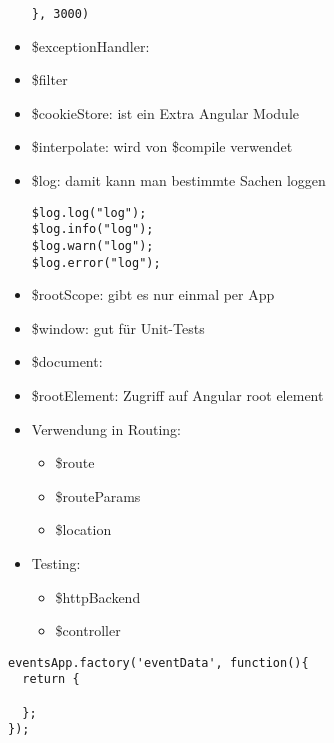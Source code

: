 \begin{itemize}
\begin{verbatim}
}, 3000)
    \end{verbatim}
  \item \$exceptionHandler:
  \item \$filter
  \item \$cookieStore: ist ein Extra Angular Module
  \item \$interpolate: wird von \$compile verwendet
  \item \$log: damit kann man bestimmte Sachen loggen
    \begin{verbatim}
$log.log("log");
$log.info("log");
$log.warn("log");
$log.error("log");
    \end{verbatim}
  \item \$rootScope: gibt es nur einmal per App
  \item \$window: gut für Unit-Tests
  \item \$document:
  \item \$rootElement: Zugriff auf Angular root element
  \item Verwendung in Routing:
    \begin{itemize}
      \item \$route
      \item \$routeParams
      \item \$location
    \end{itemize}
  \item Testing:
    \begin{itemize}
      \item \$httpBackend
      \item \$controller
    \end{itemize}
\end{itemize}


\begin{verbatim}
eventsApp.factory('eventData', function(){
  return {

  };
});

\end{verbatim}


